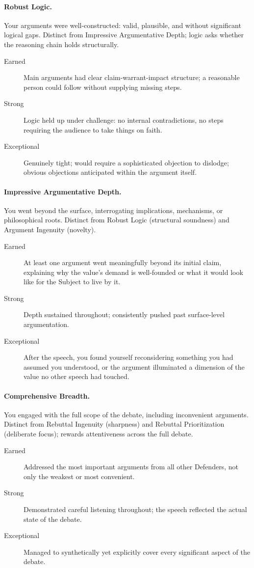 \paragraph{Robust Logic.} Your arguments were well-constructed: valid, plausible, and without significant logical gaps. Distinct from Impressive Argumentative Depth; logic asks whether the reasoning chain holds structurally.
\begin{description}
    \item[Earned] Main arguments had clear claim-warrant-impact structure; a reasonable person could follow without supplying missing steps.
    \item[Strong] Logic held up under challenge: no internal contradictions, no steps requiring the audience to take things on faith.
    \item[Exceptional] Genuinely tight; would require a sophisticated objection to dislodge; obvious objections anticipated within the argument itself.
\end{description}

\paragraph{Impressive Argumentative Depth.} You went beyond the surface, interrogating implications, mechanisms, or philosophical roots. Distinct from Robust Logic (structural soundness) and Argument Ingenuity (novelty).
\begin{description}
    \item[Earned] At least one argument went meaningfully beyond its initial claim, explaining why the value's demand is well-founded or what it would look like for the Subject to live by it.
    \item[Strong] Depth sustained throughout; consistently pushed past surface-level argumentation.
    \item[Exceptional] After the speech, you found yourself reconsidering something you had assumed you understood, or the argument illuminated a dimension of the value no other speech had touched.
\end{description}

\paragraph{Comprehensive Breadth.} You engaged with the full scope of the debate, including inconvenient arguments. Distinct from Rebuttal Ingenuity (sharpness) and Rebuttal Prioritization (deliberate focus); rewards attentiveness across the full debate.
\begin{description}
    \item[Earned] Addressed the most important arguments from all other Defenders, not only the weakest or most convenient.
    \item[Strong] Demonstrated careful listening throughout; the speech reflected the actual state of the debate.
    \item[Exceptional] Managed to synthetically yet explicitly cover every significant aspect of the debate.
\end{description}

